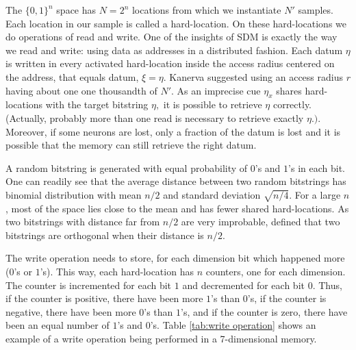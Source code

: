 The $\{0,1\}^{n}$ space has $N=2^{n}$ locations from which we instantiate $N'$ samples. Each location in our sample is called a hard-location.  On these hard-locations we do operations of read and write. One of the insights of SDM is exactly the way we read and write: using data as addresses in a distributed fashion. Each datum $\eta$ is written in every activated hard-location inside the access radius centered on the address, that equals datum, $\xi=\eta$. Kanerva suggested using an access radius $r$ having about one one thousandth of $N'$.  As an imprecise cue $\eta_{x}$ shares hard-locations with the target bitstring $\eta,$ it is possible to retrieve $\eta$ correctly. (Actually, probably more than one read is necessary to retrieve exactly $\eta.)$.  Moreover, if some neurons are lost, only a fraction of the datum is lost and it is possible that the memory can still retrieve the right datum.

A random bitstring is generated with equal probability of $0$'s and $1$'s in each bit. One can readily see that the average distance between two random bitstrings has binomial distribution with mean $n/2$ and standard deviation $\sqrt{n/4}$. For a large $n$, most of the space lies close to the mean and has fewer shared hard-locations.  As two bitstrings with distance far from $n/2$ are very improbable, \citet{Kanerva1988} defined that two bitstrings are orthogonal when their distance is $n/2$.

The write operation needs to store, for each dimension bit which happened more ($0$'s or $1$'s). This way, each hard-location has $n$ counters, one for each dimension. The counter is incremented for each bit $1$ and decremented for each bit $0$. Thus, if the counter is positive, there have been more $1$'s than $0$'s, if the counter is negative, there have been more $0$'s than $1$'s, and if the counter is zero, there have been an equal number of $1$'s and $0$'s. Table \ref{tab:write operation} shows an example of a write operation being performed in a 7-dimensional memory.

